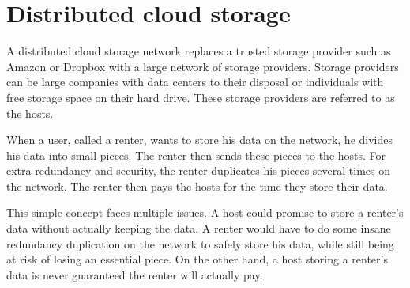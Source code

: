 \section{Distributed cloud storage}
\label{blockchain-distributed-storage}

\iffalse

- idea: instead of trusting a central party: 
  - divide your storage data into little pieces and send the pieces to different storage providers => process of dividing is referred to as sharding. storage providers can be anyone: large companies with data centers or individuals with available space on their hard drive. 
  - you send your shards of data to a storage provider. you can send every shard just once, or you could store it multiple times to be sure your data never disappears. the renter pays the hosts for the time they store their data.

- however: multiple issues arise in this system: what if a host promises to store your data, but actually does not, what if a renter doesn't pay for the used storage space?

- there are currently several solutions out there that try implement this concept, such as siacoin, storj and swarm. Others, such as ipfs and maidsafe, want to go even further trying to replace the internet as we know it.

\fi

A distributed cloud storage network replaces a trusted storage provider such as Amazon or Dropbox with a large network of storage providers. Storage providers can be large companies with data centers to their disposal or individuals with free storage space on their hard drive. These storage providers are referred to as the hosts. 

When a user, called a renter, wants to store his data on the network, he divides his data into small pieces. The renter then sends these pieces to the hosts. For extra redundancy and security, the renter duplicates his pieces several times on the network. The renter then pays the hosts for the time they store their data.

This simple concept faces multiple issues. A host could promise to store a renter's data without actually keeping the data. A renter would have to do some insane redundancy duplication on the network to safely store his data, while still being at risk of losing an essential piece. On the other hand, a host storing a renter's data is never guaranteed the renter will actually pay.

